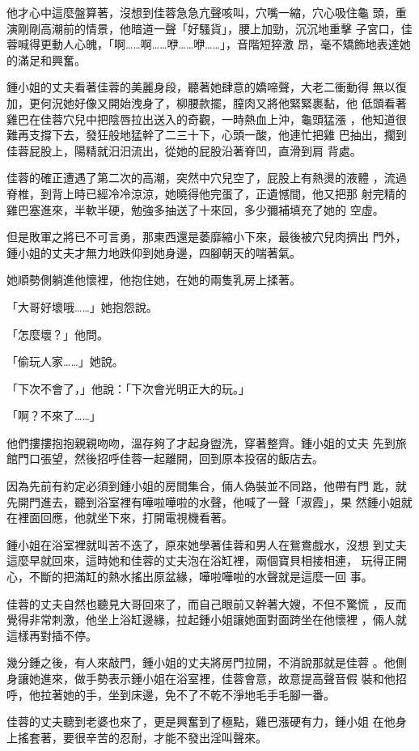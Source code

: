 他才心中這麼盤算著，沒想到佳蓉急急亢聲咳叫，穴嘴一縮，穴心吸住龜
頭，重演剛剛高潮前的情景，他暗道一聲「好騷貨」，腰上加勁，沉沉地重擊
子宮口，佳蓉喊得更動人心魄，「啊……啊……咿……咿……」，音階短猝激
昂，毫不矯飾地表達她的滿足和興奮。

鍾小姐的丈夫看著佳蓉的美麗身段，聽著她肆意的嬌啼聲，大老二衝動得
無以復加，更何況她好像又開始洩身了，柳腰款擺，膣肉又將他緊緊裹黏，他
低頭看著雞巴在佳蓉穴兒中把陰唇拉出送入的奇觀，一時熱血上沖，龜頭猛漲
，他知道很難再支撐下去，發狂般地猛幹了二三十下，心頭一酸，他連忙把雞
巴抽出，擱到佳蓉屁股上，陽精就汨汨流出，從她的屁股沿著脊凹，直滑到肩
背處。

佳蓉的確正遭遇了第二次的高潮，突然中穴兒空了，屁股上有熱燙的液體
，流過脊椎，到背上時已經冷冷涼涼，她曉得他完蛋了，正遺憾間，他又把那
射完精的雞巴塞進來，半軟半硬，勉強多抽送了十來回，多少彌補填充了她的
空虛。

但是敗軍之將已不可言勇，那東西還是萎靡縮小下來，最後被穴兒肉擠出
門外，鍾小姐的丈夫才無力地跌仰到她身邊，四腳朝天的喘著氣。

她順勢側躺進他懷裡，他抱住她，在她的兩隻乳房上揉著。

「大哥好壞哦……」她抱怨說。

「怎麼壞？」他問。

「偷玩人家……」她說。

「下次不會了，」他說：「下次會光明正大的玩。」

「啊？不來了……」

他們摟摟抱抱親親吻吻，溫存夠了才起身盥洗，穿著整齊。鍾小姐的丈夫
先到旅館門口張望，然後招呼佳蓉一起離開，回到原本投宿的飯店去。

因為先前有約定必須到鍾小姐的房間集合，倆人偽裝並不同路，他帶有門
匙，就先開門進去，聽到浴室裡有嘩啦嘩啦的水聲，他喊了一聲「淑霞」，果
然鍾小姐就在裡面回應，他就坐下來，打開電視機看著。

鍾小姐在浴室裡就叫苦不迭了，原來她學著佳蓉和男人在鴛鴦戲水，沒想
到丈夫這麼早就回來，這時她和佳蓉的丈夫泡在浴缸裡，兩個寶貝相接相連，
玩得正開心，不斷的把滿缸的熱水搖出原盆緣，嘩啦嘩啦的水聲就是這麼一回
事。

佳蓉的丈夫自然也聽見大哥回來了，而自己眼前又幹著大嫂，不但不驚慌
，反而覺得非常刺激，他坐上浴缸邊緣，拉起鍾小姐讓她面對面跨坐在他懷裡
，倆人就這樣再對插不停。

幾分鍾之後，有人來敲門，鍾小姐的丈夫將房門拉開，不消說那就是佳蓉
。他側身讓她進來，做手勢表示鍾小姐在浴室裡，佳蓉會意，故意提高聲音假
裝和他招呼，他拉著她的手，坐到床邊，免不了不乾不淨地毛手毛腳一番。

佳蓉的丈夫聽到老婆也來了，更是興奮到了極點，雞巴漲硬有力，鍾小姐
在他身上搖套著，要很辛苦的忍耐，才能不發出淫叫聲來。

